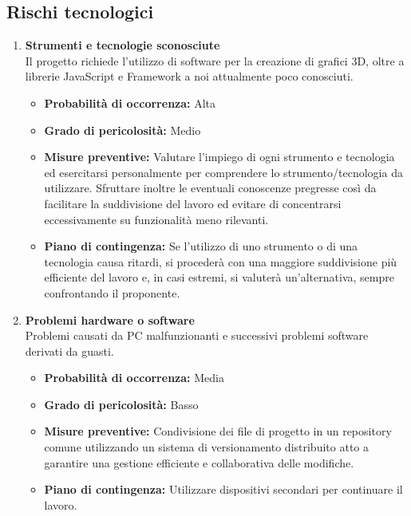\subsection{Rischi tecnologici}
\begin{enumerate}
    \item \textbf{Strumenti e tecnologie sconosciute}\\
    Il progetto richiede l'utilizzo di software per la creazione di grafici 3D, oltre a librerie JavaScript e Framework a noi attualmente poco conosciuti.
    \begin{itemize}
        \item \textbf{Probabilità di occorrenza:} Alta
        \item \textbf{Grado di pericolosità:} Medio
        \item \textbf{Misure preventive:} Valutare l’impiego di ogni strumento e tecnologia ed esercitarsi personalmente per comprendere lo strumento/tecnologia da utilizzare. Sfruttare inoltre le eventuali conoscenze pregresse così da facilitare la suddivisione del lavoro ed evitare di concentrarsi eccessivamente su funzionalità meno rilevanti.
        \item \textbf{Piano di contingenza:} Se l’utilizzo di uno strumento o di una tecnologia causa ritardi, si procederà con una maggiore suddivisione più efficiente del lavoro e, in casi estremi, si valuterà un’alternativa, sempre confrontando il proponente.
    \end{itemize}

    \item \textbf{Problemi hardware o software}\\
    Problemi causati da PC malfunzionanti e successivi problemi software derivati da guasti.
    \begin{itemize}
        \item \textbf{Probabilità di occorrenza:} Media
        \item \textbf{Grado di pericolosità:} Basso
        \item \textbf{Misure preventive:} Condivisione dei file di progetto in un repository comune utilizzando un sistema di versionamento distribuito atto a garantire una gestione efficiente e collaborativa delle modifiche.
        \item \textbf{Piano di contingenza:} Utilizzare dispositivi secondari per continuare il lavoro.
    \end{itemize}

\end{enumerate}


